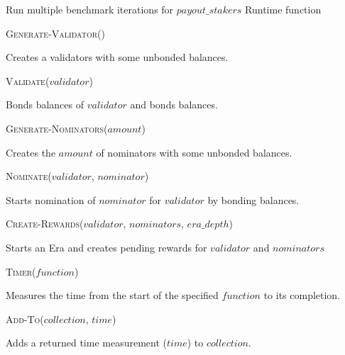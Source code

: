 \documentclass[11pt,a4paper]{article}
\newcommand{\SubItem}[1]{
    {\setlength\itemindent{15pt} \item[-] #1}
}
\begin{document}
\begin{algorithm}[H]
  \caption{Run multiple benchmark iterations for $payout\_stakers$ Runtime function}
  \SetAlgoLined
  \BlankLine
\end{algorithm}

\begin{itemize}
  \item \textsc{Generate-Validator()}
  \SubItem{Creates a validators with some unbonded balances.}
  \item \textsc{Validate($validator$)}
  \SubItem{Bonds balances of $validator$ and bonds balances.}
  \item \textsc{Generate-Nominators($amount$)}
  \SubItem{Creates the $amount$ of nominators with some unbonded balances.}
  \item \textsc{Nominate($validator$, $nominator$)}
  \SubItem{Starts nomination of $nominator$ for $validator$ by bonding balances.}
  \item \textsc{Create-Rewards($validator$, $nominators$, $era\_depth$)}
  \SubItem{Starts an Era and creates pending rewards for $validator$ and $nominators$}
  \item \textsc{Timer($function$)} \SubItem{Measures the time from the start of
      the specified $function$ to its completion.}
  \item \textsc{Add-To($collection$, $time$)} \SubItem{Adds a returned time
      measurement ($time$) to $collection$.}
\end{itemize}
\end{document}
